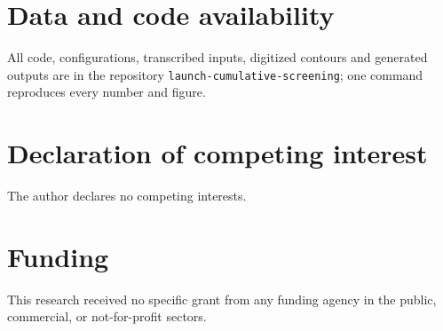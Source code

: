 \documentclass[preprint,12pt,authoryear]{elsarticle}
\begin{document}
\section*{Data and code availability}
All code, configurations, transcribed inputs, digitized contours and generated outputs are in the repository \texttt{launch-cumulative-screening}; one command reproduces every number and figure.

\section*{Declaration of competing interest}
The author declares no competing interests.

\section*{Funding}
This research received no specific grant from any funding agency in the public, commercial, or not-for-profit sectors.



\end{document}
